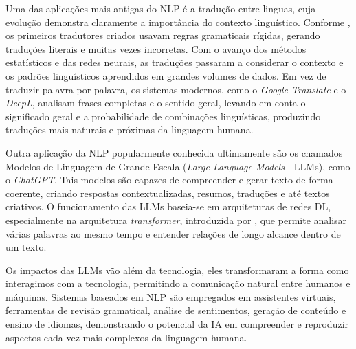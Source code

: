 Uma das aplicações mais antigas do NLP é a tradução entre linguas, cuja evolução demonstra claramente a importância do contexto linguístico. Conforme \textcite{hutchins2005history}, os primeiros tradutores criados usavam regras gramaticais rígidas, gerando traduções literais e muitas vezes incorretas.
Com o avanço dos métodos estatísticos e das redes neurais, as traduções passaram a considerar o contexto e os padrões linguísticos aprendidos em grandes volumes de dados.
Em vez de traduzir palavra por palavra, os sistemas modernos, como o \textit{Google Translate} e o \textit{DeepL}, analisam frases completas e o sentido geral, levando em conta o significado geral e a probabilidade de combinações linguísticas, produzindo traduções mais naturais e próximas da linguagem humana.

Outra aplicação da NLP popularmente conhecida ultimamente são os chamados Modelos de Linguagem de Grande Escala (\textit{Large Language Models} - LLMs), como o \textit{ChatGPT}. Tais modelos são capazes de compreender e gerar texto de forma coerente, criando respostas contextualizadas, resumos, traduções e até textos criativos. O funcionamento das LLMs baseia-se em arquiteturas de redes DL, especialmente na arquitetura  \textit{transformer}, introduzida por \textcite{vaswani2017attention}, que permite analisar várias palavras ao mesmo tempo e entender relações de longo alcance dentro de um texto.

Os impactos das LLMs vão além da tecnologia, eles transformaram a forma como interagimos com a tecnologia, permitindo a comunicação natural entre humanos e máquinas. Sistemas baseados em NLP são empregados em assistentes virtuais, ferramentas de revisão gramatical, análise de sentimentos, geração de conteúdo e ensino de idiomas, demonstrando o potencial da IA em compreender e reproduzir aspectos cada vez mais complexos da linguagem humana.


